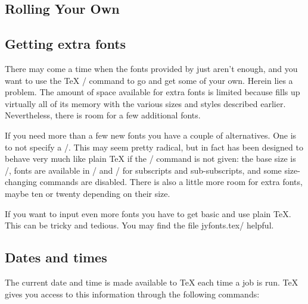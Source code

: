 \begin{(|it
name|/)}
\begin{(|it
name|/)}
\begin{narrow}[.80in]
\begin{narrow}
\begin{eqnseries}
{\bigfonts\bfs\section{Rolling Your Own}}

{\sl\subsection{Getting extra fonts}}

There may come a time when the fonts provided by \jyTeX{} just aren't enough,
and you want to use the \TeX{} \tts\font/ command to go and get some of your
own.  Herein lies a problem.  The amount of space available for extra fonts is
limited because \jyTeX{} fills up virtually all of its memory with the various
sizes and styles described earlier.  Nevertheless, there is room for a few
additional fonts.

If you need more than a few new fonts you have a couple of alternatives.  One
is to not specify a \tts\typesize/.  This may seem pretty radical, but in fact
\jyTeX{} has been designed to behave very much like plain \TeX{} if the
\tts\typesize/ command is not given: the base size is /, fonts are
available in / and / for subscripts and sub-subscripts, and some
size-changing commands are disabled.  There is also a little more room for
extra fonts, maybe ten or twenty depending on their size.

If you want to input even more fonts you have to get basic and use plain \TeX.
This can be tricky and tedious.  You may find the file \tts jyfonts.tex/
helpful.

{\sl\subsection{Dates and times}}

The current date and time is made available to \TeX{} each time a job is run.
\TeX{} gives you access to this information through the following commands:

\nobreak\smallskip



\end{eqnseries}
\end{narrow}
\end{narrow}
\end{(|it
name|/)}
\end{(|it
name|/)}
